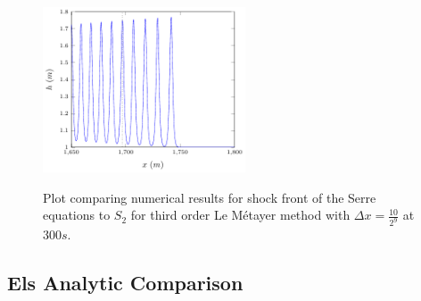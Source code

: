 \documentclass[pdf]{beamer}
\newcommand\solidrule[1][0.25cm]{\rule[0.5ex]{#1}{1pt}}
\newcommand{\dotrule}[1]{%
	\parbox[]{#1}{\dotfill}}
\begin{document}

\begin{frame}{}
	\begin{figure}
		\centering
		\includegraphics[width=6cm]{../Pics/Edit/S2.pdf}
		\label{fig:SWWcompSplus}
		\caption{Plot comparing numerical results for shock front of the Serre equations to $S_2$  for third order Le M\'{e}tayer method with $\Delta x = \frac{10}{2^{9}}$ at $300s$.}	
	\end{figure}
	
\end{frame}

\subsection{Els Analytic Comparison}
\end{document}

